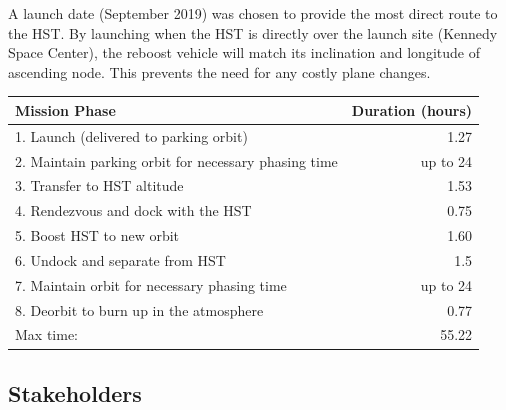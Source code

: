 \documentclass[paper=letter, fontsize=11pt]{scrartcl} %
\numberwithin{equation}{section} %
\numberwithin{figure}{section} %
\numberwithin{table}{section} %
\begin{document}
A launch date (September 2019) was chosen to provide the most direct route to the HST. By launching when the HST is directly over the launch site (Kennedy Space Center), the reboost vehicle will match its inclination and longitude of ascending node. This prevents the need for any costly plane changes.


\begin{table}[H]
    \begin{center}
        \begin{tabular}{l r}
            \toprule
            Mission Phase                                        & Duration (hours) \\
            \midrule
            1. Launch (delivered to parking orbit)               & 1.27             \\
            2. Maintain parking orbit for necessary phasing time & up to 24         \\
            3. Transfer to HST altitude                          & 1.53             \\
            4. Rendezvous and dock with the HST                  & 0.75             \\
            5. Boost HST to new orbit                            & 1.60             \\
            6. Undock and separate from HST                      & 1.5              \\
            7. Maintain orbit for necessary phasing time         & up to 24         \\
            8. Deorbit to burn up in the atmosphere              & 0.77             \\
            \bottomrule
            Max time:                                            & 55.22            \\
            \bottomrule
        \end{tabular}
    \end{center}
\end{table}

\subsection{Stakeholders}
\end{document}
